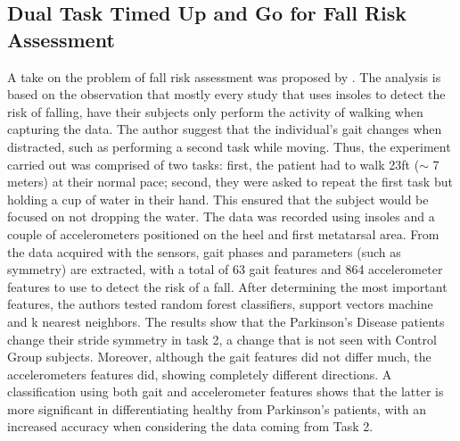 \subsection{Dual Task Timed Up and Go for Fall Risk Assessment}
A take on the problem of fall risk assessment was proposed by \cite{ParkinsonCupOWater}. The analysis is based on the observation that mostly every study that uses insoles to detect the risk of falling, have their subjects only perform the activity of walking when capturing the data. The author suggest that the individual's gait changes when distracted, such as performing a second task while moving. 
Thus, the experiment carried out was comprised of two tasks: first, the patient had to walk 23ft ($\sim$ 7 meters) at their normal pace; second, they were asked to repeat the first task but holding a cup of water in their hand. This ensured that the subject would be focused on not dropping the water.
The data was recorded using insoles and a couple of accelerometers positioned on the heel and first metatarsal area. 
From the data acquired with the sensors, gait phases and parameters (such as symmetry) are extracted, with a total of 63 gait features and 864 accelerometer features to use to detect the risk of a fall. After determining the most important features, the authors tested random forest classifiers, support vectors machine and k nearest neighbors.
The results show that the Parkinson's Disease patients change their stride symmetry in task 2, a change that is not seen with Control Group subjects.
Moreover, although the gait features did not differ much, the accelerometers features did, showing completely different directions. A classification using both gait and accelerometer features shows that the latter is more significant in differentiating healthy from Parkinson's patients, with an increased accuracy when considering the data coming from Task 2.

